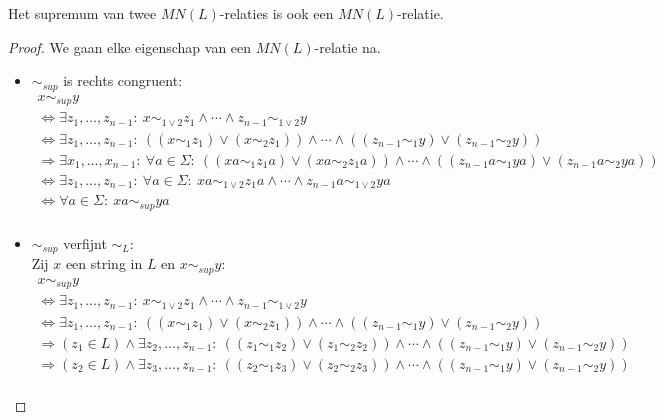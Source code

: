 \documentclass[main.tex]{subfiles}
\begin{document}
\begin{st}
  Het supremum van twee $MN(L)$-relaties is ook een $MN(L)$-relatie.

  \begin{proof}
    We gaan elke eigenschap van een $MN(L)$-relatie na.
    \begin{itemize}
    \item $\sim_{sup}$ is rechts congruent:\\
      \[
      \begin{array}{l}
      x\sim_{sup}y\\
      \Leftrightarrow \exists z_{1},\dotsc,z_{n-1}:\ x\sim_{1 \vee 2}z_{1} \wedge \dotsb \wedge z_{n-1} \sim_{1 \vee 2} y\\
      \Leftrightarrow \exists z_{1},\dotsc,z_{n-1}:\ ((x \sim_{1} z_{1}) \vee (x \sim_{2} z_{1})) \wedge \dotsb \wedge ((z_{n-1} \sim_{1} y) \vee (z_{n-1} \sim_{2} y))\\
      \Rightarrow \exists x_{1},\dotsc,x_{n-1}:\ \forall a \in \Sigma:\ ((xa \sim_{1} z_{1}a) \vee (xa \sim_{2} z_{1}a)) \wedge \dotsb \wedge ((z_{n-1}a \sim_{1} ya) \vee (z_{n-1}a \sim_{2} ya))\\
      \Leftrightarrow \exists z_{1},\dotsc,z_{n-1}:\ \forall a \in \Sigma:\ xa\sim_{1 \vee 2}z_{1}a \wedge \dotsb \wedge z_{n-1}a \sim_{1 \vee 2} ya\\
      \Leftrightarrow \forall a \in \Sigma:\ xa \sim_{sup} ya\\
      \end{array}
      \]
    \item $\sim_{sup}$ verfijnt $\sim_{L}$:\\
      Zij $x$ een string in $L$ en $x\sim_{sup}y$:
      \[
      \begin{array}{l}
        x\sim_{sup}y\\
        \Leftrightarrow \exists z_{1},\dotsc,z_{n-1}:\ x\sim_{1 \vee 2}z_{1} \wedge \dotsb \wedge z_{n-1} \sim_{1 \vee 2} y\\
        \Leftrightarrow \exists z_{1},\dotsc,z_{n-1}:\ ((x \sim_{1} z_{1}) \vee (x \sim_{2} z_{1})) \wedge \dotsb \wedge ((z_{n-1} \sim_{1} y) \vee (z_{n-1} \sim_{2} y))\\
        \Rightarrow (z_{1} \in L) \wedge \exists z_{2},\dotsc,z_{n-1}:\ ((z_{1} \sim_{1} z_{2}) \vee (z_{1} \sim_{2} z_{2})) \wedge \dotsb \wedge ((z_{n-1} \sim_{1} y) \vee (z_{n-1} \sim_{2} y))\\
        \Rightarrow (z_{2} \in L) \wedge \exists z_{3},\dotsc,z_{n-1}:\ ((z_{2} \sim_{1} z_{3}) \vee (z_{2} \sim_{2} z_{3})) \wedge \dotsb \wedge ((z_{n-1} \sim_{1} y) \vee (z_{n-1} \sim_{2} y))\\

\end{array}\]
\end{itemize}
\end{proof}
\end{st}
\end{document}

